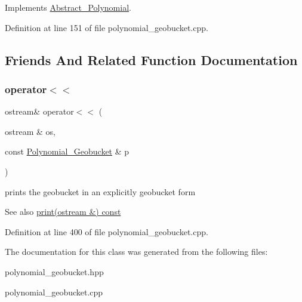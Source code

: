 Implements \hyperlink{class_abstract___polynomial_a1fcdd29c324c660ea935197c39e682f2}{Abstract\+\_\+\+Polynomial}.



Definition at line 151 of file polynomial\+\_\+geobucket.\+cpp.



\subsection{Friends And Related Function Documentation}
\mbox{\label{class_polynomial___geobucket_af97062198c6ade3e8d3077308e89669d}} 
\subsubsection{\texorpdfstring{operator$<$$<$}{operator<<}}
{\footnotesize\ttfamily ostream\& operator$<$$<$ (\begin{DoxyParamCaption}\item[{ostream \&}]{os,  }\item[{const \hyperlink{class_polynomial___geobucket}{Polynomial\+\_\+\+Geobucket} \&}]{p }\end{DoxyParamCaption})\hspace{0.3cm}{\ttfamily [friend]}}



prints the geobucket in an explicitly geobucket form 

\begin{DoxySeeAlso}{See also}
\hyperlink{class_polynomial___geobucket_a90a039a358138a6e38a563ec6a9b4bc7}{print(ostream \&) const} 
\end{DoxySeeAlso}


Definition at line 400 of file polynomial\+\_\+geobucket.\+cpp.



The documentation for this class was generated from the following files\+:\begin{DoxyCompactItemize}
\item 
polynomial\+\_\+geobucket.\+hpp\item 
polynomial\+\_\+geobucket.\+cpp\end{DoxyCompactItemize}
